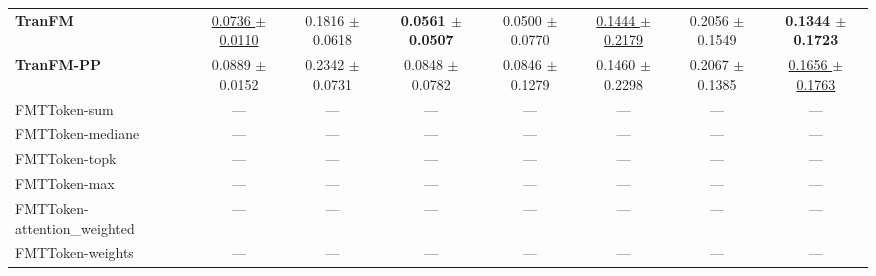 \begin{table}[H]
{\begin{tabular}{lccccccc}
\textbf{TranFM} & \underline{0.0736 $\pm$ 0.0110} & 0.1816 $\pm$ 0.0618 & \textbf{0.0561 $\pm$ 0.0507} & 0.0500 $\pm$ 0.0770 & \underline{0.1444 $\pm$ 0.2179} & 0.2056 $\pm$ 0.1549 & \textbf{0.1344 $\pm$ 0.1723} \\
\textbf{TranFM-PP} & 0.0889 $\pm$ 0.0152 & 0.2342 $\pm$ 0.0731 & 0.0848 $\pm$ 0.0782 & 0.0846 $\pm$ 0.1279 & 0.1460 $\pm$ 0.2298 & 0.2067 $\pm$ 0.1385 & \underline{0.1656 $\pm$ 0.1763} \\
FMTToken-sum & — & — & — & — & — & — & — \\
FMTToken-mediane & — & — & — & — & — & — & — \\
FMTToken-topk & — & — & — & — & — & — & — \\
FMTToken-max & — & — & — & — & — & — & — \\
FMTToken-attention_weighted & — & — & — & — & — & — & — \\
FMTToken-weights & — & — & — & — & — & — & — \\
\bottomrule
\end{tabular}
}
\label{tab:reuters}
\end{table}

